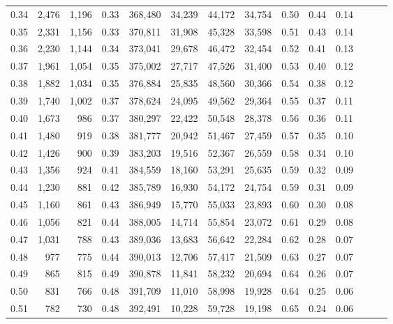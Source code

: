 \begin{tabular}{rrrrrrrrrrrrrr}
0.34 &   2,476 &  1,196 &  0.33 &  368,480 &   34,239 &  44,172 &  34,754 &  0.50 &  0.44 &      0.14 \\
0.35 &   2,331 &  1,156 &  0.33 &  370,811 &   31,908 &  45,328 &  33,598 &  0.51 &  0.43 &      0.14 \\
0.36 &   2,230 &  1,144 &  0.34 &  373,041 &   29,678 &  46,472 &  32,454 &  0.52 &  0.41 &      0.13 \\
0.37 &   1,961 &  1,054 &  0.35 &  375,002 &   27,717 &  47,526 &  31,400 &  0.53 &  0.40 &      0.12 \\
0.38 &   1,882 &  1,034 &  0.35 &  376,884 &   25,835 &  48,560 &  30,366 &  0.54 &  0.38 &      0.12 \\
0.39 &   1,740 &  1,002 &  0.37 &  378,624 &   24,095 &  49,562 &  29,364 &  0.55 &  0.37 &      0.11 \\
0.40 &   1,673 &    986 &  0.37 &  380,297 &   22,422 &  50,548 &  28,378 &  0.56 &  0.36 &      0.11 \\
0.41 &   1,480 &    919 &  0.38 &  381,777 &   20,942 &  51,467 &  27,459 &  0.57 &  0.35 &      0.10 \\
0.42 &   1,426 &    900 &  0.39 &  383,203 &   19,516 &  52,367 &  26,559 &  0.58 &  0.34 &      0.10 \\
0.43 &   1,356 &    924 &  0.41 &  384,559 &   18,160 &  53,291 &  25,635 &  0.59 &  0.32 &      0.09 \\
0.44 &   1,230 &    881 &  0.42 &  385,789 &   16,930 &  54,172 &  24,754 &  0.59 &  0.31 &      0.09 \\
0.45 &   1,160 &    861 &  0.43 &  386,949 &   15,770 &  55,033 &  23,893 &  0.60 &  0.30 &      0.08 \\
0.46 &   1,056 &    821 &  0.44 &  388,005 &   14,714 &  55,854 &  23,072 &  0.61 &  0.29 &      0.08 \\
0.47 &   1,031 &    788 &  0.43 &  389,036 &   13,683 &  56,642 &  22,284 &  0.62 &  0.28 &      0.07 \\
0.48 &     977 &    775 &  0.44 &  390,013 &   12,706 &  57,417 &  21,509 &  0.63 &  0.27 &      0.07 \\
0.49 &     865 &    815 &  0.49 &  390,878 &   11,841 &  58,232 &  20,694 &  0.64 &  0.26 &      0.07 \\
0.50 &     831 &    766 &  0.48 &  391,709 &   11,010 &  58,998 &  19,928 &  0.64 &  0.25 &      0.06 \\
0.51 &     782 &    730 &  0.48 &  392,491 &   10,228 &  59,728 &  19,198 &  0.65 &  0.24 &      0.06 \\

\end{tabular}
